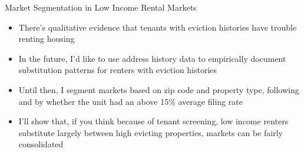 \documentclass[10pt, xcolor=dvipsnames]{beamer}
\begin{document}
    

\begin{frame}{Market Segmentation in Low Income Rental Markets}
    \begin{itemize}
        \item There's qualitative evidence that tenants with eviction histories have trouble renting housing \parencite{desmond-evicted}
        \pause
        \item In the future, I'd like to use address history data to empirically document substitution patterns for renters with eviction histories
        \pause
        \item Until then, I segment markets based on zip code and property type, following \parencite{framoutar2024market, calderwang2024algorithmic} and by whether the unit had an above 15\% average filing rate
        \pause
        \item I'll show that, if you think because of tenant screening, low income renters substitute largely between high evicting properties, markets can be fairly consolidated
    \end{itemize}
\end{frame}
\end{document}

